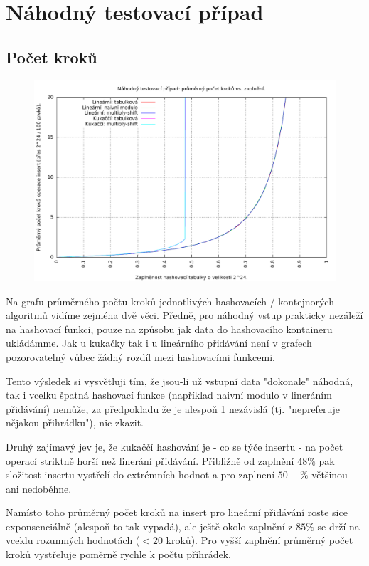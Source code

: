 \documentclass[12pt,a4paper]{report}
\begin{document}
	
	\section{Náhodný testovací případ}
	\subsection{Počet kroků}
	\begin{figure}[h]	
		\centering	
		\includegraphics[scale=0.6]{graph_rand_steps}		
	\end{figure}

Na grafu průměrného počtu kroků jednotlivých hashovacích / kontejnorých algoritmů vidíme zejména dvě věci. Předně, pro náhodný vstup prakticky nezáleží na hashovací funkci, pouze na způsobu jak data do hashovacího kontaineru ukládámme. Jak u kukačky tak i u lineárního přidávání není v grafech pozorovatelný vůbec žádný rozdíl mezi hashovacími funkcemi. 

Tento výsledek si vysvětluji tím, že jsou-li už vstupní data "dokonale" náhodná, tak i vcelku špatná hashovací funkce (například naivní modulo v lineráním přidávání) nemůže, za předpokladu že je alespoň 1 nezávislá (tj. "nepreferuje nějakou přihrádku"), nic zkazit.

Druhý zajímavý jev je, že kukaččí hashování je - co se týče insertu - na počet operací striktně horší než linerání přidávání. Přibližně od zaplnění $48 \%$ pak složitost insertu vystřelí do  extrémních hodnot a pro zaplnení $50+ \%$ většinou ani nedoběhne. 

Namísto toho průměrný počet kroků na insert pro lineární přidávání roste sice exponsenciálně (alespoň to tak vypadá), ale ještě okolo zaplnění z $85 \%$ se drží na vceklu rozumných hodnotách ($<20$ kroků). Pro vyšší zaplnění průměrný počet kroků vystřeluje poměrně rychle k počtu příhrádek.
\end{document}
